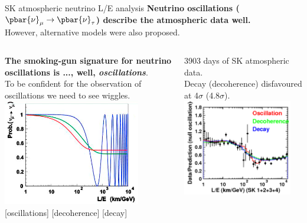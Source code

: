 \begin{frame}[t]{SK atmospheric neutrino L/E analysis}
\centering
{\bf Neutrino oscillations ($\pbar{\nu}_{\mu} \rightarrow \pbar{\nu}_{\tau}$) describe the atmospheric data well.}\\
However, alternative models were also proposed.\\
\vspace{0.2cm}
\begin{columns}
  \begin{column}{0.50\textwidth}
    \centering
    {\scriptsize
     {\bf The smoking-gun signature for neutrino oscillations is ..., well, {\em oscillations}}.\\
     To be confident for the observation of oscillations we need to see wiggles.\\
    }
    \includegraphics[width=0.80\textwidth]{./images/3nu/atmo/le_schematic.png}\\
    {\scriptsize {\color{blue}[oscillations]} {\color{red}[decoherence]} {\color{green}[decay]}}
  \end{column}
  \begin{column}{0.50\textwidth}
    \centering
    {\scriptsize
      3903 days of SK atmospheric data.\\
      Decay (decoherence) disfavoured at 4$\sigma$ (4.8$\sigma$).\\
    }
    \includegraphics[width=0.90\textwidth]{./images/3nu/atmo/sk_le.png}\\

\end{column}
\end{columns}
\end{frame}
